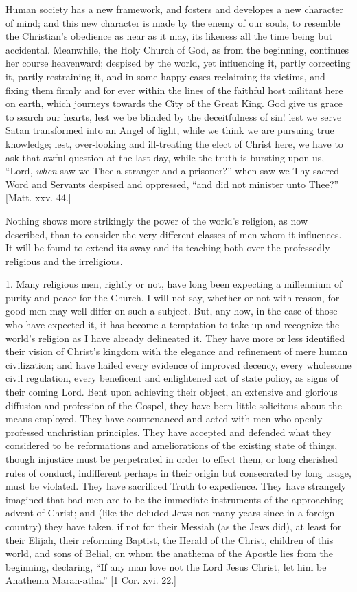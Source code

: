 Human society has a new framework, and fosters and
developes a new character of mind; and this new character
is made by the enemy of our souls, to resemble the
Christian's obedience as near as it may, its likeness all
the time being but accidental. Meanwhile, the Holy Church
of God, as from the beginning, continues her course
heavenward; despised by the world, yet influencing it,
partly correcting it, partly restraining it, and in some
happy cases reclaiming its victims, and fixing them
firmly and for ever within the lines of the faithful host
militant here on earth, which journeys towards the City
of the Great King. God give us grace to search our
hearts, lest we be blinded by the deceitfulness of sin!
lest we serve Satan transformed into an Angel of light,
while we think we are pursuing true knowledge; lest,
over-looking and ill-treating the elect of Christ here,
we have to ask that awful question at the last day, while
the truth is bursting upon us, ``Lord, \emph{when}
saw we Thee a stranger and a prisoner?'' when saw we
Thy sacred Word and Servants despised and oppressed,
``and did not minister unto Thee?'' [Matt. xxv.
44.]

Nothing shows more strikingly the power of the world's
religion, as now described, than to consider the very
different classes of men whom it influences. It will be
found to extend its sway and its teaching both over the
professedly religious and the irreligious.

1. Many religious men, rightly or not, have long been
expecting a millennium of purity and peace for the
Church. I will not say, whether or not with reason, for
good men may well differ on such a subject. But, any how,
in the case of those who have expected it, it has become
a temptation to take up and recognize the world's
religion as I have already delineated it. They have more
or less identified their vision of Christ's kingdom with
the elegance and refinement of mere human civilization; and have hailed every evidence of improved decency, every
wholesome civil regulation, every beneficent and
enlightened act of state policy, as signs of their coming
Lord. Bent upon achieving their object, an extensive and
glorious diffusion and profession of the Gospel, they
have been little solicitous about the means employed.
They have countenanced and acted with men who openly
professed unchristian principles. They have accepted and
defended what they considered to be reformations and
ameliorations of the existing state of things, though
injustice must be perpetrated in order to effect them, or
long cherished rules of conduct, indifferent perhaps in
their origin but consecrated by long usage, must be
violated. They have sacrificed Truth to expedience. They
have strangely imagined that bad men are to be the
immediate instruments of the approaching advent of
Christ; and (like the deluded Jews not many years since
in a foreign country) they have taken, if not for their
Messiah (as the Jews did), at least for their Elijah,
their reforming Baptist, the Herald of the Christ,
children of this world, and sons of Belial, on whom the
anathema of the Apostle lies from the beginning,
declaring, ``If any man love not the Lord Jesus
Christ, let him be Anathema Maran-atha.'' [1 Cor.
xvi. 22.]

